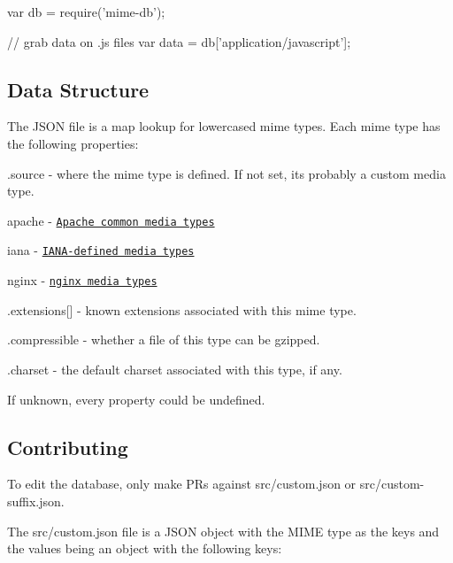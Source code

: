 \begin{DoxyCode}
var db = require('mime-db');

// grab data on .js files
var data = db['application/javascript'];
\end{DoxyCode}


\subsection*{Data Structure}

The J\+S\+ON file is a map lookup for lowercased mime types. Each mime type has the following properties\+:


\begin{DoxyItemize}
\item {\ttfamily .source} -\/ where the mime type is defined. If not set, it\textquotesingle{}s probably a custom media type.
\begin{DoxyItemize}
\item {\ttfamily apache} -\/ \href{http://svn.apache.org/repos/asf/httpd/httpd/trunk/docs/conf/mime.types}{\tt Apache common media types}
\item {\ttfamily iana} -\/ \href{http://www.iana.org/assignments/media-types/media-types.xhtml}{\tt I\+A\+N\+A-\/defined media types}
\item {\ttfamily nginx} -\/ \href{http://hg.nginx.org/nginx/raw-file/default/conf/mime.types}{\tt nginx media types}
\end{DoxyItemize}
\item {\ttfamily .extensions\mbox{[}\mbox{]}} -\/ known extensions associated with this mime type.
\item {\ttfamily .compressible} -\/ whether a file of this type can be gzipped.
\item {\ttfamily .charset} -\/ the default charset associated with this type, if any.
\end{DoxyItemize}

If unknown, every property could be {\ttfamily undefined}.

\subsection*{Contributing}

To edit the database, only make P\+Rs against {\ttfamily src/custom.\+json} or {\ttfamily src/custom-\/suffix.\+json}.

The {\ttfamily src/custom.\+json} file is a J\+S\+ON object with the M\+I\+ME type as the keys and the values being an object with the following keys\+:


